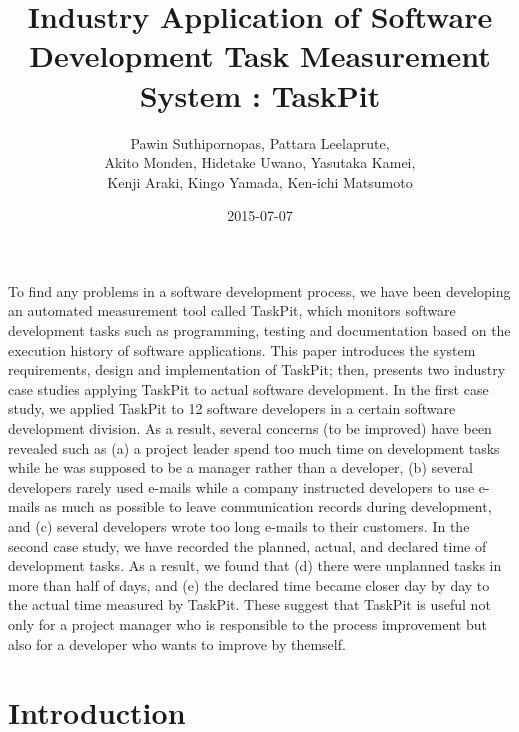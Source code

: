 \documentclass [paper]{ieice}
\title {Industry Application of Software Development Task Measurement System : TaskPit}
\author{Pawin Suthipornopas,
		Pattara Leelaprute, \\
		Akito Monden, 
		Hidetake Uwano, 
		Yasutaka Kamei, \\
		Kenji Araki, 
		Kingo Yamada, 
		Ken-ichi Matsumoto}
\date {2015-07-07}
\begin{document}
\maketitle
\begin {summary}
	To find any problems in a software development process, we have been developing an automated measurement tool called TaskPit, which monitors software development tasks such as programming, testing and documentation based on the execution history of software applications. This paper introduces the system requirements, design and implementation of TaskPit; then, presents two industry case studies applying TaskPit to actual software development. In the first case study, we applied TaskPit to 12 software developers in a certain software development division. As a result, several concerns (to be improved) have been revealed such as (a) a project leader spend too much time on development tasks while he was supposed to be a manager rather than a developer, (b) several developers rarely used e-mails while a company instructed developers to use e-mails as much as possible to leave communication records during development, and (c) several developers wrote too long e-mails to their customers. In the second case study, we have recorded the planned, actual, and declared time of development tasks. As a result, we found that (d) there were unplanned tasks in more than half of days, and (e) the declared time became closer day by day to the actual time measured by TaskPit. These suggest that TaskPit is useful not only for a project manager who is responsible to the process improvement but also for a developer who wants to improve by themself.
\end {summary}
	
\section {Introduction}
	
\end{document}
